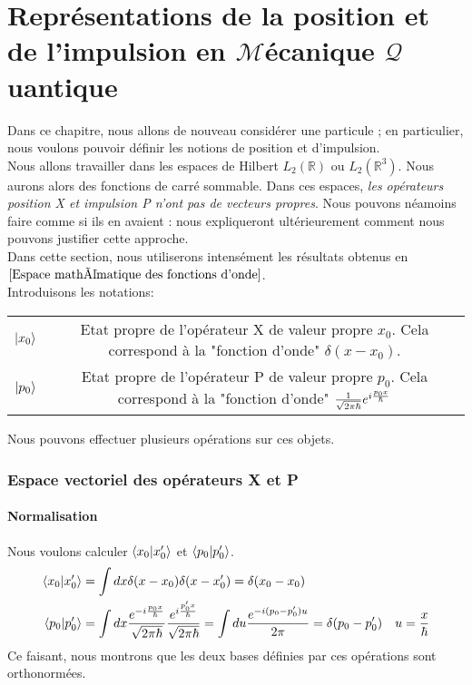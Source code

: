 \documentclass[../Notesdecours.tex]{subfiles}
\begin{document}
\part{Représentations de la position et de l'impulsion en $\mathcal{M}$écanique $\mathcal{Q}$uantique}
Dans ce chapitre, nous allons de nouveau considérer une particule ; en particulier, nous voulons pouvoir définir les notions de position et d'impulsion.\\

Nous allons travailler dans les espaces de Hilbert $L_2(\mathbb{R})$ ou $L_2 (\mathbb{R}^3)$. Nous aurons alors des fonctions de carré sommable. Dans ces espaces, \emph{les opérateurs position X et impulsion P n'ont pas de vecteurs propres}. Nous pouvons néamoins faire comme si ils en avaient : nous expliqueront ultérieurement comment nous pouvons justifier cette approche.\\

Dans cette section, nous utiliserons intensément les résultats obtenus en $\ref{Espace mathématique des fonctions d'onde}$.\\

Introduisons les notations:
\begin{center}
\begin{tabular}{c|c}
$\ket{x_0} $ & Etat propre de l'opérateur X de valeur propre $x_0$. Cela correspond à la "fonction d'onde" $\delta(x-x_0)$.\\
$\ket{p_0} $ & Etat propre de l'opérateur P de valeur propre $p_0$. Cela correspond à la "fonction d'onde" $\frac{1}{\sqrt{2\pi\hbar}}e^{i \frac{p_0 x}{\hbar}}$
\end{tabular}
\end{center}

Nous pouvons effectuer plusieurs opérations sur ces objets. 

\section{Espace vectoriel des opérateurs X et P}
\subsection{Normalisation}
Nous voulons calculer $\braket{x_0|x_0'}$ et $\braket{p_0|p_0'}$. 
	\begin{align*}
\braket{x_0|x_0'} &= \int dx \delta (x-x_0)\delta(x-x_0') = \delta (x_0 - x_0)\\
\braket{p_0|p_0'} &= \int dx \frac{e^{-i \frac{p_0 x}{\hbar}}}{\sqrt{2\pi\hbar}} \frac{e^{i \frac{p_0'x}{\hbar}}}{\sqrt{2\pi\hbar}} = \int du \frac{e^{-i (p_0 - p_0')u}}{2\pi}	= \delta (p_0-p_0')	&u = \frac{x}{\hbar}\\
	\end{align*}
Ce faisant, nous montrons que les deux bases définies par ces opérations sont orthonormées.
\end{document}
